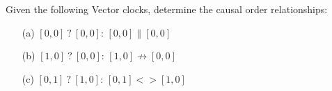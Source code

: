 \begin{Answer} Given the following Vector clocks, determine the causal order relationships:

    \begin{itemize}
        \item[(a)] $[0,0]\ ?\ [0,0]$: $[0,0] \parallel [0,0]$
        \item[(b)] $[1,0]\ ?\ [0,0]$: $[1,0] \not\rightarrow [0,0]$
        \item[(c)] $[0,1]\ ?\ [1,0]$: $[0,1] <> [1,0]$
    \end{itemize}
\end{Answer}
